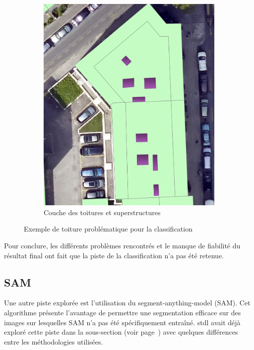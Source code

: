 \begin{figure}[H]
\begin{subfigure}[b]{0.475\textwidth}
        \includegraphics[width=\textwidth]{02-main/figures/ch3/ch3_piste_exploree_classification_09_resultats_image__toiture_sp.png}
        \caption{Couche des toitures et superstructures}
        \label{fig:ch3_piste_exploree_classification_09_resultats_image__toiture_sp}
    \end{subfigure}

    \caption{Exemple de toiture problématique pour la classification}
    \label{fig:piste_exploree_classification_resultats_explications}
\end{figure}

Pour conclure, les différents problèmes rencontrés et le manque de fiabilité du résultat final ont fait que la piste de la classification n'a pas été retenue.


\newpage
\subsection{SAM}
Une autre piste explorée est l'utilisation du segment-anything-model (SAM). Cet algorithme présente l'avantage de permettre une segmentation efficace sur des images sur lesquelles SAM n'a pas été spécifiquement entraîné. \acrshort{stdl} avait déjà exploré cette piste dans la sous-section \textit{} (voir page~\pageref{subsec:stdl_analyse}) avec quelques différences entre les méthodologies utilisées.

